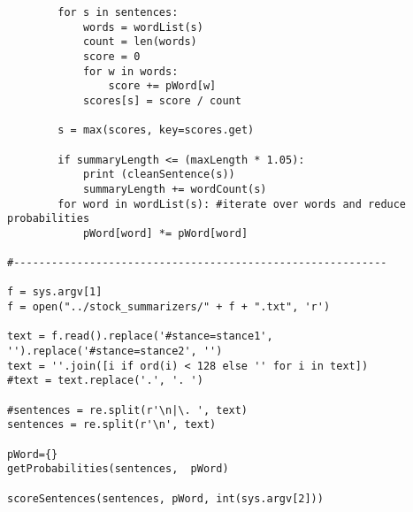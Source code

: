 \documentclass{article}
\begin{document}
\begin{verbatim}
        for s in sentences:
            words = wordList(s)
            count = len(words)
            score = 0
            for w in words:
                score += pWord[w]
            scores[s] = score / count

        s = max(scores, key=scores.get)

        if summaryLength <= (maxLength * 1.05):
            print (cleanSentence(s))
            summaryLength += wordCount(s)
        for word in wordList(s): #iterate over words and reduce probabilities
            pWord[word] *= pWord[word]

#-----------------------------------------------------------

f = sys.argv[1]
f = open("../stock_summarizers/" + f + ".txt", 'r')

text = f.read().replace('#stance=stance1', '').replace('#stance=stance2', '')
text = ''.join([i if ord(i) < 128 else '' for i in text])
#text = text.replace('.', '. ')

#sentences = re.split(r'\n|\. ', text)
sentences = re.split(r'\n', text)

pWord={}
getProbabilities(sentences,  pWord)

scoreSentences(sentences, pWord, int(sys.argv[2]))


\end{verbatim}
\pagebreak
\end{document}
